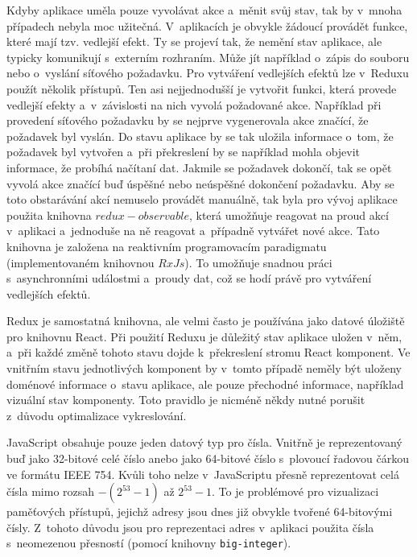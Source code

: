 Kdyby aplikace uměla pouze vyvolávat akce a~měnit svůj stav, tak by v~mnoha případech nebyla moc užitečná. V~aplikacích je obvykle žádoucí provádět funkce, které mají tzv. vedlejší efekt. Ty se projeví tak, že nemění stav aplikace, ale typicky komunikují s~externím rozhraním. Může jít například o~zápis do souboru nebo o~vyslání síťového požadavku. Pro vytváření vedlejších efektů lze v~Reduxu použít několik přístupů. Ten asi nejjednodušší je vytvořit funkci, která provede vedlejší efekty a~v~závislosti na nich vyvolá požadované akce. Například při provedení síťového požadavku by se nejprve vygenerovala akce značící, že požadavek byl vyslán. Do stavu aplikace by se tak uložila informace o~tom, že požadavek byl vytvořen a~při překreslení by se například mohla objevit informace, že probíhá načítaní dat. Jakmile se požadavek dokončí, tak se opět vyvolá akce značící buď úspěšné nebo neúspěšné dokončení požadavku. Aby se toto obstarávání akcí nemuselo provádět manuálně, tak byla pro vývoj aplikace použita knihovna $redux-observable$, která umožňuje reagovat na proud akcí v~aplikaci a~jednoduše na ně reagovat a~případně vytvářet nové akce. Tato knihovna je založena na reaktivním programovacím paradigmatu (implementovaném knihovnou $RxJs$). To umožňuje snadnou práci s~asynchronními událostmi a~proudy dat, což se hodí právě pro vytváření vedlejších efektů.

Redux je samostatná knihovna, ale velmi často je používána jako datové úložiště pro knihovnu React. Při použití Reduxu je důležitý stav aplikace uložen v~něm, a~při každé změně tohoto stavu dojde k~překreslení stromu React komponent. Ve vnitřním stavu jednotlivých komponent by v~tomto případě neměly být uloženy doménové informace o~stavu aplikace, ale pouze přechodné informace, například vizuální stav komponenty. Toto pravidlo je nicméně někdy nutné porušit z~důvodu optimalizace vykreslování.

JavaScript obsahuje pouze jeden datový typ pro čísla. Vnitřně je reprezentovaný buď jako 32-bitové celé číslo anebo jako 64-bitové číslo s~plovoucí řadovou čárkou ve formátu IEEE 754. Kvůli toho nelze v~JavaScriptu přesně reprezentovat celá čísla mimo rozsah $-(2^{53} - 1)$ až $2^{53} - 1$. To je problémové pro vizualizaci paměťových přístupů, jejichž adresy jsou dnes již obvykle tvořené 64-bitovými čísly. Z~tohoto důvodu jsou pro reprezentaci adres v~aplikaci použita čísla s~neomezenou přesností (pomocí knihovny \texttt{big-integer}).


